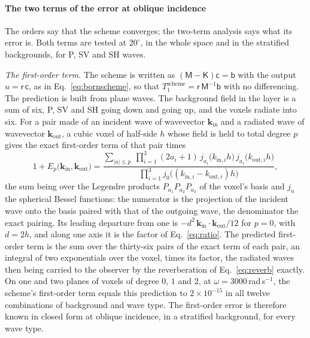 \documentclass[preprint,review,12pt]{elsarticle}
\begin{document}
\paragraph{The two terms of the error at oblique incidence} The orders say that the scheme
converges; the two-term analysis says what its error is. Both terms are tested at $20^\circ$, in the
whole space and in the stratified backgrounds, for P, SV and SH waves.

\emph{The first-order term.} The scheme is written as $(\mathsf{M}-\mathsf{K})\mathsf{c}=\mathsf{b}$ with
the output $u=\mathsf{r}\,\mathsf{c}$, as in Eq.~\eqref{eq:bornscheme}, so that
$T_1^{\text{scheme}}=\mathsf{r}\,\mathsf{M}^{-1}\mathsf{b}$ with no differencing. The prediction is built
from plane waves. The background field in the layer is a sum of six, P, SV and SH going down and going
up, and the voxels radiate into six. For a pair made of an incident wave of wavevector
$\mathbf{k}_{\text{in}}$ and a radiated wave of wavevector $\mathbf{k}_{\text{out}}$, a cubic voxel of
half-side $h$ whose field is held to total degree $p$ gives the exact first-order term of that pair
times
\begin{equation}\label{eq:wavefactor}
  1+E_p\bigl(\mathbf{k}_{\text{in}},\mathbf{k}_{\text{out}}\bigr)
  =\frac{\displaystyle\sum_{|a|\le p}\ \prod_{i=1}^{3}(2a_i+1)\,
        j_{a_i}\bigl(k_{\text{in},i}h\bigr)\,j_{a_i}\bigl(k_{\text{out},i}h\bigr)}
       {\displaystyle\prod_{i=1}^{3}j_0\bigl((k_{\text{in},i}-k_{\text{out},i})h\bigr)},
\end{equation}
the sum being over the Legendre products $P_{a_1}P_{a_2}P_{a_3}$ of the voxel's basis and $j_n$ the
spherical Bessel functions: the numerator is the projection of the incident wave onto the basis paired
with that of the outgoing wave, the denominator the exact pairing. Its leading departure from one is
$-d^2\,\mathbf{k}_{\text{in}}\cdot\mathbf{k}_{\text{out}}/12$ for $p=0$, with $d=2h$, and along one axis it is the
factor of Eq.~\eqref{eq:ratio}. The predicted first-order term is the sum over the thirty-six pairs of
the exact term of each pair, an integral of two exponentials over the voxel, times its factor, the
radiated waves then being carried to the observer by the reverberation of Eq.~\eqref{eq:reverb}
exactly. On one and two planes of voxels of degree $0$, $1$ and $2$, at
$\omega=3000$\,rad\,s$^{-1}$, the scheme's first-order term equals this prediction to
$2\times10^{-15}$ in all twelve combinations of background and wave type. The first-order error is
therefore known in closed form at oblique incidence, in a stratified background, for every wave type.
\end{document}
